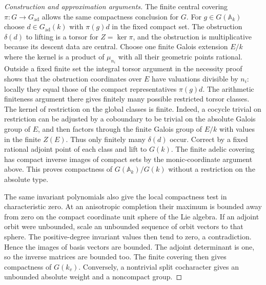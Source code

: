 \documentclass[11pt,a4paper,openany,oneside]{book}
\theoremstyle{resultstyle}
\theoremstyle{definition}
\numberwithin{equation}{chapter}
\begin{document}
\begin{proof}[Construction and approximation arguments]
The finite central covering \(\pi:G\to G_{\mathrm{ad}}\)
allows the same compactness conclusion for \(G\).
For \(g\in G(\mathbb A_k)\) choose
\(d\in G_{\mathrm{ad}}(k)\) with \(\pi(g)d\)
in the fixed compact set. The obstruction
\(\delta(d)\) to lifting is a torsor for
\(Z=\ker\pi\), and the obstruction is
multiplicative because its descent data are
central. Choose one finite Galois extension
\(E/k\) where the kernel is a product of
\(\mu_{n_i}\) with all their geometric points
rational. Outside a fixed finite set the
integral torsor argument in the necessity
proof shows that the obstruction coordinates over
\(E\) have valuations divisible by \(n_i\):
locally they equal those of the compact
representatives \(\pi(g)d\). The arithmetic
finiteness argument there gives finitely many
possible restricted torsor classes. The kernel of
restriction on the global classes is finite.
Indeed, a cocycle trivial on restriction can be
adjusted by a coboundary to be trivial on the
absolute Galois group of \(E\), and then factors
through the finite Galois group of \(E/k\) with
values in the finite \(Z(E)\). Thus only finitely
many \(\delta(d)\) occur. Correct by a fixed
rational adjoint point of each class and lift
to \(G(k)\). The finite adelic covering has
compact inverse images of compact sets by the
monic-coordinate argument above. This proves
compactness of \(G(\mathbb A_k)/G(k)\) without
a restriction on the absolute type.

The same invariant polynomials also give the
local compactness test in characteristic zero.
At an anisotropic completion their maximum
is bounded away from zero on the compact
coordinate unit sphere of the Lie algebra.
If an adjoint orbit were unbounded, scale an
unbounded sequence of orbit vectors to that
sphere. The positive-degree invariant values
then tend to zero, a contradiction. Hence
the images of basis vectors are bounded.
The adjoint determinant is one, so the
inverse matrices are bounded too. The
finite covering then gives compactness
of \(G(k_v)\). Conversely, a nontrivial
split cocharacter gives an unbounded
absolute weight and a noncompact group.


\end{proof}
\end{document}
